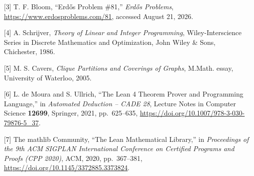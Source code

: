 \documentclass[english,11pt,a4paper]{article}
\begin{document}
{[}3{]} T. F. Bloom, ``Erdős Problem \#81,'' \emph{Erdős Problems},
\url{https://www.erdosproblems.com/81}, accessed August 21, 2026.

{[}4{]} A. Schrijver, \emph{Theory of Linear and Integer Programming},
Wiley-Interscience Series in Discrete Mathematics and Optimization, John
Wiley \& Sons, Chichester, 1986.

{[}5{]} M. S. Cavers, \emph{Clique Partitions and Coverings of Graphs},
M.Math. essay, University of Waterloo, 2005.

{[}6{]} L. de Moura and S. Ullrich, ``The Lean 4 Theorem Prover and
Programming Language,'' in \emph{Automated Deduction -- CADE 28},
Lecture Notes in Computer Science \textbf{12699}, Springer, 2021,
pp.~625--635, \url{https://doi.org/10.1007/978-3-030-79876-5_37}.

{[}7{]} The mathlib Community, ``The Lean Mathematical Library,'' in
\emph{Proceedings of the 9th ACM SIGPLAN International Conference on
Certified Programs and Proofs (CPP 2020)}, ACM, 2020, pp.~367--381,
\url{https://doi.org/10.1145/3372885.3373824}.
\end{document}
